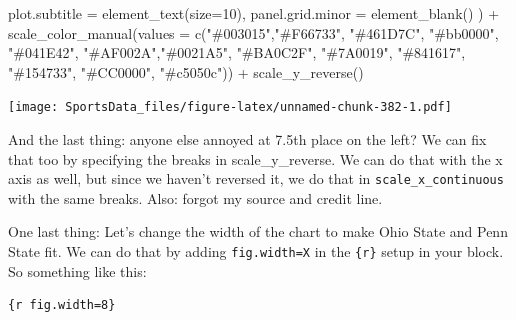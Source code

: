 \documentclass[
]{book}
\newenvironment{Shaded}{\begin{snugshade}}{\end{snugshade}}
\newcommand{\AttributeTok}[1]{\textcolor[rgb]{0.77,0.63,0.00}{#1}}
\newcommand{\DecValTok}[1]{\textcolor[rgb]{0.00,0.00,0.81}{#1}}
\newcommand{\FunctionTok}[1]{\textcolor[rgb]{0.00,0.00,0.00}{#1}}
\newcommand{\NormalTok}[1]{#1}
\newcommand{\SpecialCharTok}[1]{\textcolor[rgb]{0.00,0.00,0.00}{#1}}
\newcommand{\StringTok}[1]{\textcolor[rgb]{0.31,0.60,0.02}{#1}}
\begin{document}
\begin{Shaded}
\begin{Highlighting}[]
    \AttributeTok{plot.subtitle =} \FunctionTok{element\_text}\NormalTok{(}\AttributeTok{size=}\DecValTok{10}\NormalTok{), }
    \AttributeTok{panel.grid.minor =} \FunctionTok{element\_blank}\NormalTok{()}
\NormalTok{    ) }\SpecialCharTok{+}
  \FunctionTok{scale\_color\_manual}\NormalTok{(}\AttributeTok{values =} \FunctionTok{c}\NormalTok{(}\StringTok{"\#003015"}\NormalTok{,}\StringTok{"\#F66733"}\NormalTok{, }\StringTok{"\#461D7C"}\NormalTok{, }\StringTok{"\#bb0000"}\NormalTok{, }\StringTok{"\#041E42"}\NormalTok{, }\StringTok{"\#AF002A"}\NormalTok{,}\StringTok{"\#0021A5"}\NormalTok{, }\StringTok{"\#BA0C2F"}\NormalTok{, }\StringTok{"\#7A0019"}\NormalTok{, }\StringTok{"\#841617"}\NormalTok{, }\StringTok{"\#154733"}\NormalTok{, }\StringTok{"\#CC0000"}\NormalTok{, }\StringTok{"\#c5050c"}\NormalTok{)) }\SpecialCharTok{+}
  \FunctionTok{scale\_y\_reverse}\NormalTok{() }
\end{Highlighting}
\end{Shaded}

\texttt{[image: SportsData\_files/figure-latex/unnamed-chunk-382-1.pdf]}

And the last thing: anyone else annoyed at 7.5th place on the left? We can fix that too by specifying the breaks in scale\_y\_reverse. We can do that with the x axis as well, but since we haven't reversed it, we do that in \texttt{scale\_x\_continuous} with the same breaks. Also: forgot my source and credit line.

One last thing: Let's change the width of the chart to make Ohio State and Penn State fit. We can do that by adding \texttt{fig.width=X} in the \texttt{\{r\}} setup in your block. So something like this:

\begin{verbatim}
{r fig.width=8}
\end{verbatim}
\end{document}
